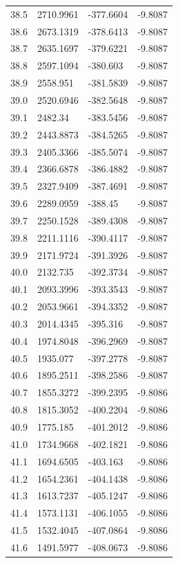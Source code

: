 \begin{table}[H]
\begin{tabular}{llll}
38.5 & 2710.9961 & -377.6604 & -9.8087 \\
38.6 & 2673.1319 & -378.6413 & -9.8087 \\
38.7 & 2635.1697 & -379.6221 & -9.8087 \\
38.8 & 2597.1094 & -380.603 & -9.8087 \\
38.9 & 2558.951 & -381.5839 & -9.8087 \\
39.0 & 2520.6946 & -382.5648 & -9.8087 \\
39.1 & 2482.34 & -383.5456 & -9.8087 \\
39.2 & 2443.8873 & -384.5265 & -9.8087 \\
39.3 & 2405.3366 & -385.5074 & -9.8087 \\
39.4 & 2366.6878 & -386.4882 & -9.8087 \\
39.5 & 2327.9409 & -387.4691 & -9.8087 \\
39.6 & 2289.0959 & -388.45 & -9.8087 \\
39.7 & 2250.1528 & -389.4308 & -9.8087 \\
39.8 & 2211.1116 & -390.4117 & -9.8087 \\
39.9 & 2171.9724 & -391.3926 & -9.8087 \\
40.0 & 2132.735 & -392.3734 & -9.8087 \\
40.1 & 2093.3996 & -393.3543 & -9.8087 \\
40.2 & 2053.9661 & -394.3352 & -9.8087 \\
40.3 & 2014.4345 & -395.316 & -9.8087 \\
40.4 & 1974.8048 & -396.2969 & -9.8087 \\
40.5 & 1935.077 & -397.2778 & -9.8087 \\
40.6 & 1895.2511 & -398.2586 & -9.8087 \\
40.7 & 1855.3272 & -399.2395 & -9.8086 \\
40.8 & 1815.3052 & -400.2204 & -9.8086 \\
40.9 & 1775.185 & -401.2012 & -9.8086 \\
41.0 & 1734.9668 & -402.1821 & -9.8086 \\
41.1 & 1694.6505 & -403.163 & -9.8086 \\
41.2 & 1654.2361 & -404.1438 & -9.8086 \\
41.3 & 1613.7237 & -405.1247 & -9.8086 \\
41.4 & 1573.1131 & -406.1055 & -9.8086 \\
41.5 & 1532.4045 & -407.0864 & -9.8086 \\
41.6 & 1491.5977 & -408.0673 & -9.8086 \\

\end{tabular}
\end{table}
